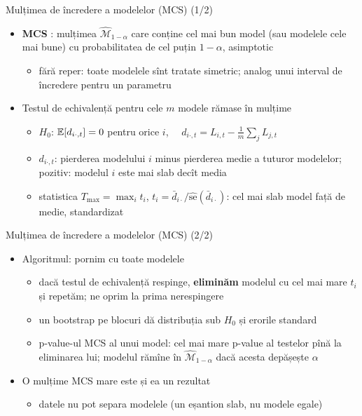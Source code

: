 \begin{frame}{Mulțimea de încredere a modelelor (MCS) (1/2)}
\itemsize{\small}
\begin{itemize}
    \item \textbf{MCS} : mulțimea $\hat{\mathcal M}_{1-\alpha}$ care conține cel mai bun model (sau modelele cele mai bune) cu probabilitatea de cel puțin $1 - \alpha$, asimptotic
    \begin{itemize}
        \item fără reper: toate modelele sînt tratate simetric; analog unui interval de încredere pentru un parametru
    \end{itemize}
    \item Testul de echivalență pentru cele $m$ modele rămase în mulțime
    \begin{itemize}
        \item $H_0$: $\mathbb{E}[d_{i\cdot,t}] = 0$ pentru orice $i$, $\quad d_{i\cdot,t} = L_{i,t} - \frac1m\sum_j L_{j,t}$
        \item $d_{i\cdot,t}$: pierderea modelului $i$ minus pierderea medie a tuturor modelelor; pozitiv: modelul $i$ este mai slab decît media
        \item statistica $T_{\max} = \max_i t_i$, $t_i = \bar d_{i\cdot}/\widehat{\mathrm{se}}(\bar d_{i\cdot})$: cel mai slab model față de medie, standardizat
    \end{itemize}
\end{itemize}
\end{frame}

\begin{frame}{Mulțimea de încredere a modelelor (MCS) (2/2)}
\itemsize{\small}
\begin{itemize}
    \item Algoritmul: pornim cu toate modelele
    \begin{itemize}
        \item dacă testul de echivalență respinge, \textbf{eliminăm} modelul cu cel mai mare $t_i$ și repetăm; ne oprim la prima nerespingere
        \item un bootstrap pe blocuri dă distribuția sub $H_0$ și erorile standard
        \item p-value-ul MCS al unui model: cel mai mare p-value al testelor pînă la eliminarea lui; modelul rămîne în $\hat{\mathcal M}_{1-\alpha}$ dacă acesta depășește $\alpha$
    \end{itemize}
    \item O mulțime MCS mare este și ea un rezultat
    \begin{itemize}
        \item datele nu pot separa modelele (un eșantion slab, nu modele egale)
    \end{itemize}
\end{itemize}
\end{frame}


